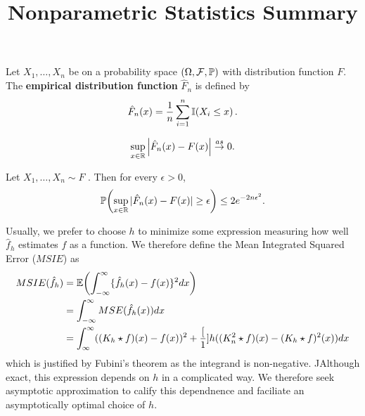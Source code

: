 

\title{Nonparametric Statistics Summary}



\maketitle

Let $X_{1}, \dots, X_{n}$ be \iid on a probability space $(\Omega,
\mathcal{F}, \Prob)$ with distribution function $F$.  The
\textbf{empirical distribution function} $\hat F_{n}$ is defined by
\begin{equation}
  \label{eq:1}
  \hat F_{n}(x) = \frac{1}{n} \sum_{i=1}^{n} \I{X_{i} \leq x}.
\end{equation}

\begin{thm}
  \label{defn:Introduction:2}
  \begin{equation}
    \label{eq:2}
    \sup_{x \in \mathbb{R}} \left| \hat F_{n}(x) - F(x) \right| \overset{as}{\rightarrow} 0.
  \end{equation}
\end{thm}

\begin{thm}
  \label{defn:Introduction:1}
  Let $X_{1}, \dots, X_{n} \sim F$ \iid.  Then for every $\epsilon >
  0$,
  \begin{align}
    \label{eq:7}
    \Prob{\sup_{x \in \R}|\hat F_{n}(x) - F(x)| \geq \epsilon} \leq 2 e^{-2n\epsilon^{2}}.
  \end{align}
\end{thm}

\begin{defn}
  Usually, we prefer to choose $h$ to minimize some expression measuring
how well $\hat f_{h}$ estimates $f$ as a function.  We therefore
define the Mean Integrated Squared Error ($MSIE$) as
\begin{align}
  \label{eq:14}
  MSIE(\hat f_{h}) &= \E{\int_{-\infty}^{\infty} \{ \hat f_{h}(x) -
    f(x) \}^{2} dx} \\
  &= \int_{-\infty}^{\infty} MSE(\hat f_{h}(x)) dx \\
  &= \int_{\infty}^{\infty} ((K_{h} \star f)(x) - f(x))^{2} +
  \frac[1]{h} ((K^{2}_{n} \star f)(x) - (K_{h} \star f)^{2}(x)) dx
\end{align} which is justified by Fubini's theorem as the integrand
is non-negative.
JAlthough exact, this expression depends on $h$ in a complicated way.
We therefore seek asymptotic approximation to calify this dependnence
and faciliate an asymptotically optimal choice of $h$.
\end{defn}

